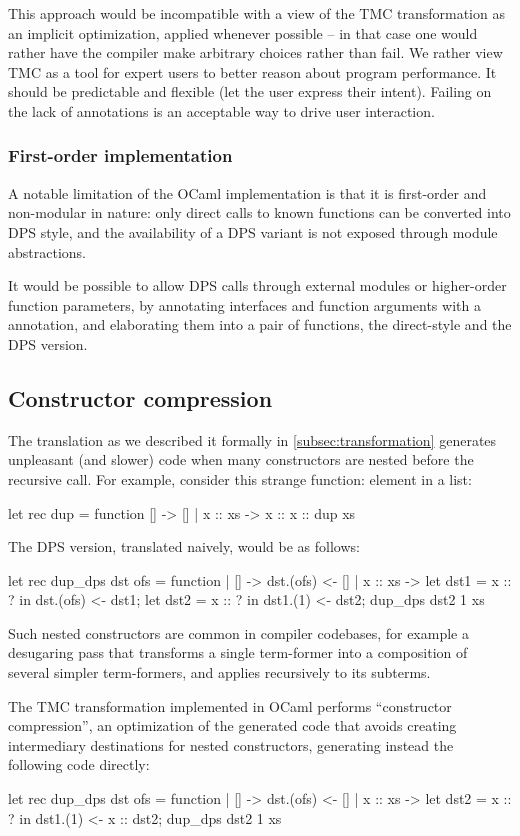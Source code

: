 This approach would be incompatible with a view of the TMC
transformation as an implicit optimization, applied whenever
possible -- in that case one would rather have the compiler make
arbitrary choices rather than fail. We rather view TMC as a tool for
expert users to better reason about program performance. It should be
predictable and flexible (let the user express
their intent). Failing on the lack of annotations is an acceptable way
to drive user interaction.

\subsubsection{First-order implementation} A notable limitation of the
OCaml implementation is that it is first-order and non-modular in
nature: only direct calls to known functions can be converted into DPS
style, and the availability of a DPS variant is not exposed through
module abstractions.

It would be possible to allow DPS calls through external modules or
higher-order function parameters, by annotating interfaces and
function arguments with a  annotation, and
elaborating them into a pair of functions, the direct-style and the DPS
version.

\subsection{Constructor compression} The translation as we described
it formally in \cref{subsec:transformation} generates unpleasant
(and slower) code when many constructors are nested before the
recursive call. For example, consider this strange function:
element in a list:
\begin{Ocaml}
let rec dup = function [] -> [] | x :: xs -> x :: x :: dup xs
\end{Ocaml}
The DPS version, translated naively, would be as follows:
\begin{Ocaml}
let rec dup_dps dst ofs = function
| [] -> dst.(ofs) <- []
| x :: xs ->
  let dst1 = x :: ? in
  dst.(ofs) <- dst1;
  let dst2 = x :: ? in
  dst1.(1) <- dst2;
  dup_dps dst2 1 xs
\end{Ocaml}
Such nested constructors are common in compiler codebases, for
example a desugaring pass that transforms a single term-former into
a composition of several simpler term-formers, and applies recursively to
its subterms.

The TMC transformation implemented in OCaml performs ``constructor compression'', an optimization of the generated code that avoids creating intermediary destinations for nested constructors, generating instead the following code directly:
\begin{Ocaml}
let rec dup_dps dst ofs = function
| [] -> dst.(ofs) <- []
| x :: xs ->
  let dst2 = x :: ? in
  dst1.(1) <- x :: dst2;
  dup_dps dst2 1 xs
\end{Ocaml}


